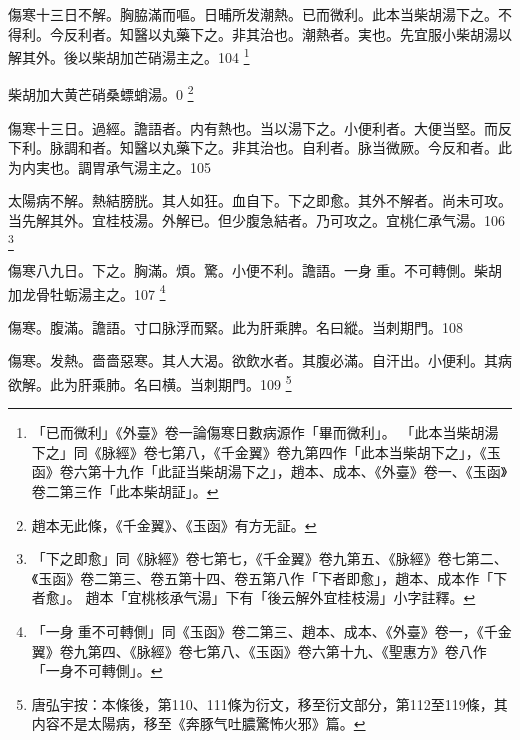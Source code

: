 傷寒十三日不解。胸脇滿而嘔。日晡所发潮熱{\khaai 。已}而微利。此本当柴胡湯下之。不得利。今反利者。知醫以丸藥下之。非其治也。潮熱者。実也。先宜服小柴胡湯以解其外。後以柴胡加芒硝湯主之。104
	\footnote{
	「已而微利」《外臺》卷一論傷寒日數病源作「畢而微利」。
	「此本当柴胡湯下之」同《脉經》卷七第八，《千金翼》卷九第四作「此本当柴胡下之」，《玉函》卷六第十九作「此証当柴胡湯下之」，趙本、成本、《外臺》卷一、《玉函》卷二第三作「此本柴胡証」。
	}

柴胡加大黄芒硝桑螵蛸湯。0
	\footnote{
		趙本无此條，《千金翼》、《玉函》有方无証。
	}

傷寒十三日。過經。譫語者。内有熱也。当以湯下之。小便利者。大便当堅。而反{\khaai 下}利。脉調和者。知醫以丸藥下之。非其治也。自利者。脉当微厥。今反和者。此为内実也。{\khaai 調胃}承气湯主之。105

太陽病不解。熱結膀胱。其人如狂。血自下。下之即愈。其外不解者。尚未可攻。当先解其外。{\khaai 宜桂枝湯。}外解已。{\khaai 但}少腹急結者。乃可攻之。宜桃仁承气湯。106
	\footnote{
		「下之即愈」同《脉經》卷七第七，《千金翼》卷九第五、《脉經》卷七第二、《玉函》卷二第三、卷五第十四、卷五第八作「下者即愈」，趙本、成本作「下者愈」。
		趙本「宜桃核承气湯」下有「後云解外宜桂枝湯」小字註釋。
	}

傷寒八九日。下之。胸滿。煩。驚。小便不利。譫語。一身{\khaaiii 𥁞}{\khaai 重。}不可轉側。柴胡加龙骨牡蛎湯主之。107
	\footnote{
		「一身{\sungii 𥁞}重不可轉側」同《玉函》卷二第三、趙本、成本、《外臺》卷一，《千金翼》卷九第四、《脉經》卷七第八、《玉函》卷六第十九、《聖惠方》卷八作「一身不可轉側」。
	}

傷寒。腹滿。譫語。寸口脉浮而緊。此为肝乘脾。名曰縱。当刺期門。108

傷寒。发熱。嗇嗇惡寒。其人大渴。欲飲水者。其腹必滿。自汗出。小便利。其病欲解。此为肝乘肺。名曰横。当刺期門。109
	\footnote{
		唐弘宇按：本條後，第110、111條为衍文，移至衍文部分，第112至119條，其内容不是太陽病，移至《奔豚气吐膿驚怖火邪》篇。
	}

%
%
%	
%
%
%
%
%
%
%
%

